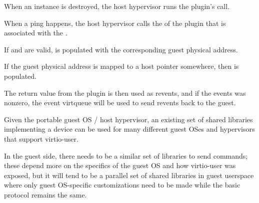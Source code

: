 When an instance is destroyed,
the host hypervisor runs the plugin's  call.

When a ping happens,
the host hypervisor calls the  of the plugin that is associated
with the .

If  and  are valid,  is populated
with the corresponding guest physical address.

If the guest physical address is mapped to a host pointer somewhere, then
 is populated.

The return value from the plugin is then used as revents,
and if the events was nonzero, the event virtqueue will be used to
send revents back to the guest.

Given the portable guest OS / host hypervisor, an existing set of shared libraries
implementing a device can be used for many different guest OSes and hypervisors
that support virtio-user.

In the guest side, there needs to be a similar set of libraries to send
commands; these depend more on the specifics of the guest OS and how
virtio-user was exposed, but it will tend to be a parallel set of shared
libraries in guest userspace where only guest OS-specific customizations need
to be made while the basic protocol remains the same.

